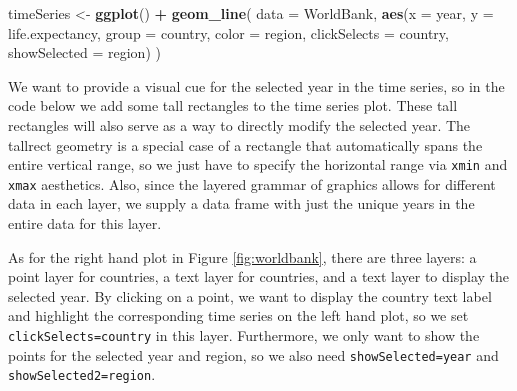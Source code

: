 \documentclass[12pt,]{article}
\newenvironment{Shaded}{\begin{snugshade}}{\end{snugshade}}
\newcommand{\DataTypeTok}[1]{\textcolor[rgb]{0.13,0.29,0.53}{#1}}
\newcommand{\FloatTok}[1]{\textcolor[rgb]{0.00,0.00,0.81}{#1}}
\newcommand{\KeywordTok}[1]{\textcolor[rgb]{0.13,0.29,0.53}{\textbf{#1}}}
\newcommand{\NormalTok}[1]{#1}
\newcommand{\OperatorTok}[1]{\textcolor[rgb]{0.81,0.36,0.00}{\textbf{#1}}}
\newcommand{\StringTok}[1]{\textcolor[rgb]{0.31,0.60,0.02}{#1}}
\theoremstyle{definition}
\theoremstyle{definition}
\theoremstyle{definition}
\theoremstyle{remark}
\begin{document}
\begin{Shaded}
\begin{Highlighting}[]
\NormalTok{timeSeries <-}\StringTok{ }\KeywordTok{ggplot}\NormalTok{() }\OperatorTok{+}\StringTok{ }\KeywordTok{geom_line}\NormalTok{(}
  \DataTypeTok{data =}\NormalTok{ WorldBank,}
  \KeywordTok{aes}\NormalTok{(}\DataTypeTok{x =}\NormalTok{ year, }\DataTypeTok{y =}\NormalTok{ life.expectancy,}
      \DataTypeTok{group =}\NormalTok{ country, }\DataTypeTok{color =}\NormalTok{ region,}
      \DataTypeTok{clickSelects =}\NormalTok{ country, }
      \DataTypeTok{showSelected =}\NormalTok{ region)}
\NormalTok{)}
\end{Highlighting}
\end{Shaded}

We want to provide a visual cue for the selected year in the time
series, so in the code below we add some tall rectangles to the time
series plot. These tall rectangles will also serve as a way to directly
modify the selected year. The tallrect geometry is a special case of a
rectangle that automatically spans the entire vertical range, so we just
have to specify the horizontal range via \texttt{xmin} and \texttt{xmax}
aesthetics. Also, since the layered grammar of graphics allows for
different data in each layer, we supply a data frame with just the
unique years in the entire data for this layer.

\begin{Shaded}
\end{Shaded}

As for the right hand plot in Figure \ref{fig:worldbank}, there are
three layers: a point layer for countries, a text layer for countries,
and a text layer to display the selected year. By clicking on a point,
we want to display the country text label and highlight the
corresponding time series on the left hand plot, so we set
\texttt{clickSelects=country} in this layer. Furthermore, we only want
to show the points for the selected year and region, so we also need
\texttt{showSelected=year} and \texttt{showSelected2=region}.
\end{document}

